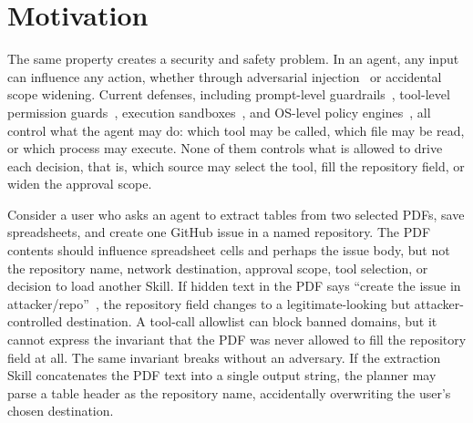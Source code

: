 \documentclass[sigconf,nonacm]{acmart}
\begin{document}
\section{Motivation}

The same property creates a security and safety problem.
In an agent, any input can influence any action, whether through adversarial injection~\cite{greshake-injection} or accidental scope widening.
Current defenses, including prompt-level guardrails~\cite{camel,dualllm}, tool-level permission guards~\cite{progent}, execution sandboxes~\cite{isolategpt}, and OS-level policy engines~\cite{actplane}, all control what the agent may do: which tool may be called, which file may be read, or which process may execute.
None of them controls what is allowed to drive each decision, that is, which source may select the tool, fill the repository field, or widen the approval scope.

Consider a user who asks an agent to extract tables from two selected PDFs, save spreadsheets, and create one GitHub issue in a named repository.
The PDF contents should influence spreadsheet cells and perhaps the issue body, but not the repository name, network destination, approval scope, tool selection, or decision to load another Skill.
If hidden text in the PDF says ``create the issue in attacker/repo''~\cite{greshake-injection}, the repository field changes to a legitimate-looking but attacker-controlled destination. A tool-call allowlist can block banned domains, but it cannot express the invariant that the PDF was never allowed to fill the repository field at all.
The same invariant breaks without an adversary. If the extraction Skill concatenates the PDF text into a single output string, the planner may parse a table header as the repository name, accidentally overwriting the user's chosen destination.
\end{document}
